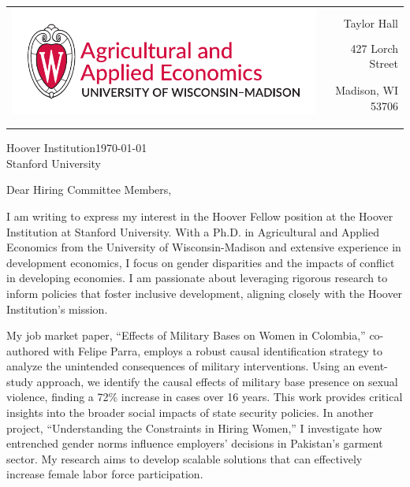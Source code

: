 \documentclass[12pt]{letter}
\begin{document}
\begin{tabularx}{\textwidth}{Xr}
\multirow{4}{*}{\includegraphics[height=3\baselineskip]{logo_cropped.pdf}} &  \\
& Taylor Hall \\
& 427 Lorch Street \\
& Madison, WI 53706 \\
[-1.8ex]\\
\\
\end{tabularx}

\newcommand{\instName}{Hoover Institution}
\newcommand{\posName}{Hoover Fellow}


\instName \hfill \today \\
Stanford University 
\medskip

Dear Hiring Committee Members,

I am writing to express my interest in the \posName \hspace{1mm} position at the \instName \hspace{1mm} at Stanford University. 
With a Ph.D. in Agricultural and Applied Economics from the University of Wisconsin-Madison and extensive experience 
in development economics, I focus on gender disparities and the impacts of conflict in developing economies. 
I am passionate about leveraging rigorous research to inform policies that foster inclusive development, 
aligning closely with the \instName's mission.

My job market paper, ``Effects of Military Bases on Women in Colombia,'' co-authored with Felipe Parra, employs 
a robust causal identification strategy to analyze the unintended consequences of military interventions. 
Using an event-study approach, we identify the causal effects of military base presence on sexual violence, finding 
a 72\% increase in cases over 16 years. This work provides critical insights into the broader social impacts of 
state security policies. In another project, ``Understanding the Constraints in Hiring Women,'' I investigate how entrenched gender 
norms influence employers' decisions in Pakistan's garment sector. 
My research aims to develop scalable solutions that can effectively increase female labor force participation.
\end{document}
